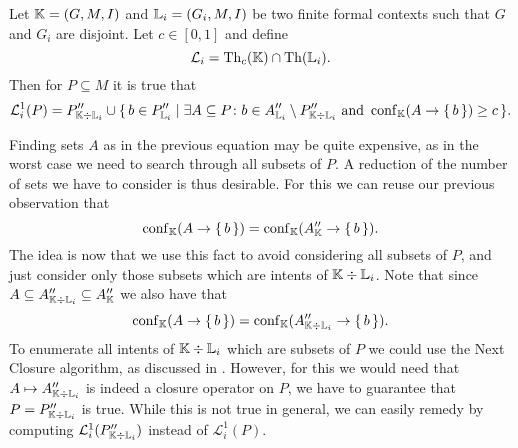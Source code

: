 \begin{Proposition}
  \label{prop:computing-confident-closure-first-try}
  Let ${\mathbb{K}} = (G, M, I)$ and ${\mathbb{L}}_{i} = (G_{i}, M, I)$ be two finite formal contexts
  such that $G$ and $G_{i}$ are disjoint.  Let $c \in [0,1]$ and define
  \begin{equation*}
    \mathcal{L}_{i} = \operatorname{Th}_{c}({\mathbb{K}}) \cap \operatorname{Th}({\mathbb{L}}_{i}).
  \end{equation*}
  Then for $P \subseteq M$ it is true that
  \begin{equation*}
    \mathcal{L}_{i}^{1}(P) = P_{{\mathbb{K}} \div {\ensuremath{\mathbb{L}}}_{i}}'' \cup {\ensuremath{\{\, b \in P_{{\mathbb{L}}_{i}}'' \mid \exists A \subseteq P \colon b \in A_{{\mathbb{L}}_{i}}'' \setminus P_{{\mathbb{K}}
      \div {\ensuremath{\mathbb{L}}}_{i}}'' \text{ and } \operatorname{conf}_{{\mathbb{K}}}(A \to {\ensuremath{\{\, b \,\}}}) \ge c \,\}}}.
  \end{equation*}
\end{Proposition}

Finding sets $A$ as in the previous equation may be quite expensive, as in the worst case
we need to search through all subsets of $P$.  A reduction of the number of sets we have
to consider is thus desirable.  For this we can reuse our previous observation that
\begin{equation*}
  \operatorname{conf}_{{\mathbb{K}}}(A \to {\ensuremath{\{\, b \,\}}}) = \operatorname{conf}_{{\mathbb{K}}}(A_{{\mathbb{K}}}'' \to {\ensuremath{\{\, b \,\}}}).
\end{equation*}
The idea is now that we use this fact to avoid considering all subsets of $P$, and just
consider only those subsets which are intents of ${\mathbb{K}} \div {\ensuremath{\mathbb{L}}}_{i}$.  Note that
since $A \subseteq A_{{\mathbb{K}} \div {\ensuremath{\mathbb{L}}}_{i}}'' \subseteq A_{{\mathbb{K}}}''$ we also have that
\begin{equation*}
  \operatorname{conf}_{{\mathbb{K}}}(A \to {\ensuremath{\{\, b \,\}}}) = \operatorname{conf}_{{\mathbb{K}}}(A_{{\mathbb{K}} \div {\ensuremath{\mathbb{L}}}_{i}}'' \to {\ensuremath{\{\,
    b \,\}}}).
\end{equation*}
To enumerate all intents of ${\mathbb{K}} \div {\ensuremath{\mathbb{L}}}_{i}$ which are subsets of $P$ we could use
the Next Closure algorithm, as discussed in .  However, for
this we would need that $A \mapsto A_{{\mathbb{K}} \div {\ensuremath{\mathbb{L}}}_{i}}''$ is indeed a closure
operator on $P$, \ie we have to guarantee that $P = P_{{\mathbb{K}} \div {\ensuremath{\mathbb{L}}}_{i}}''$ is
true.  While this is not true in general, we can easily remedy by computing
$\mathcal{L}_{i}^{1}(P_{{\mathbb{K}} \div {\ensuremath{\mathbb{L}}}_{i}}'')$ instead of $\mathcal{L}_{i}^{1}(P)$.

